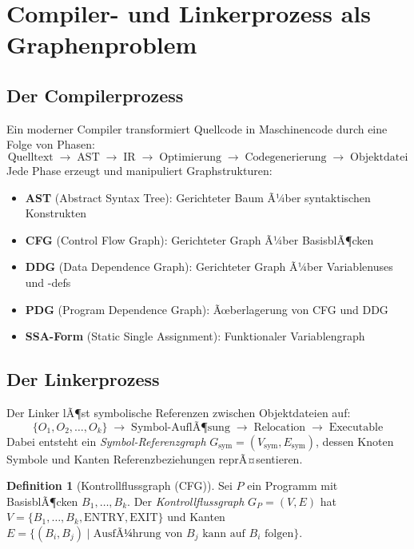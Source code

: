 ﻿\documentclass[a4paper,12pt]{article}
\theoremstyle{definition}
\newtheorem{definition}{Definition}
\begin{document}
\section{Compiler- und Linkerprozess als Graphenproblem}

\subsection{Der Compilerprozess}

Ein moderner Compiler transformiert Quellcode in Maschinencode durch eine Folge von Phasen:
\[
\text{Quelltext} \;\to\; \text{AST} \;\to\; \text{IR} \;\to\; \text{Optimierung} \;\to\; \text{Codegenerierung} \;\to\; \text{Objektdatei}
\]
Jede Phase erzeugt und manipuliert Graphstrukturen:

\begin{itemize}
    \item \textbf{AST} (Abstract Syntax Tree): Gerichteter Baum Ã¼ber syntaktischen Konstrukten
    \item \textbf{CFG} (Control Flow Graph): Gerichteter Graph Ã¼ber BasisblÃ¶cken
    \item \textbf{DDG} (Data Dependence Graph): Gerichteter Graph Ã¼ber Variablenuses und -defs
    \item \textbf{PDG} (Program Dependence Graph): Ãœberlagerung von CFG und DDG
    \item \textbf{SSA-Form} (Static Single Assignment): Funktionaler Variablengraph
\end{itemize}

\subsection{Der Linkerprozess}

Der Linker lÃ¶st symbolische Referenzen zwischen Objektdateien auf:
\[
\{O_1, O_2, \ldots, O_k\} \;\to\; \text{Symbol-AuflÃ¶sung} \;\to\; \text{Relocation} \;\to\; \text{Executable}
\]
Dabei entsteht ein \emph{Symbol-Referenzgraph} $G_{\text{sym}} = (V_{\text{sym}}, E_{\text{sym}})$, dessen Knoten Symbole und Kanten Referenzbeziehungen reprÃ¤sentieren.

\begin{definition}[Kontrollflussgraph (CFG)]
\label{def:cfg}
Sei $P$ ein Programm mit BasisblÃ¶cken $B_1, \ldots, B_k$. Der \emph{Kontrollflussgraph} $G_P = (V, E)$ hat $V = \{B_1, \ldots, B_k, \text{ENTRY}, \text{EXIT}\}$ und Kanten $E = \{(B_i, B_j) \mid \text{AusfÃ¼hrung von } B_j \text{ kann auf } B_i \text{ folgen}\}$.
\end{definition}
\end{document}
